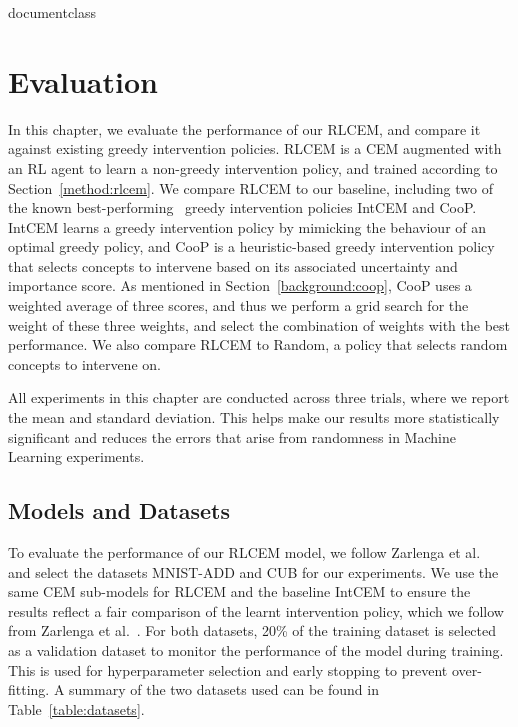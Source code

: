 \csname documentclass

\chapter{Evaluation}

In this chapter, we evaluate the performance of our RLCEM, and compare it 
against existing greedy intervention policies. RLCEM is a CEM augmented with an RL agent
to learn a non-greedy intervention policy, and trained according to Section~\ref{method:rlcem}.
We compare RLCEM to our baseline, 
including two of the known best-performing~\cite{intcem} 
greedy intervention policies
IntCEM and CooP. IntCEM learns a greedy intervention policy
by mimicking the behaviour of an optimal greedy policy,
and CooP is a heuristic-based greedy intervention policy
that selects concepts to intervene based on its associated uncertainty
and importance score. As mentioned in
Section~\ref{background:coop}, CooP uses a weighted average
of three scores, and thus we perform a grid search for the weight 
of these three weights, and select the combination of weights with the best performance.
We also compare RLCEM to Random, a policy that selects
random concepts to intervene on.


All experiments in this chapter
are conducted across three trials, where we report the mean
and standard deviation. This helps make our results more statistically significant and reduces the errors
that arise from randomness in Machine
Learning experiments.

\section{Models and Datasets}\label{method:datasets}
To evaluate the performance of our RLCEM model,
we follow Zarlenga et al.~\cite{intcem} and select the datasets MNIST-ADD and CUB for 
our experiments. 
We use the same CEM sub-models
for RLCEM and the baseline IntCEM to ensure the results reflect a fair comparison 
of the learnt intervention policy, which we follow from Zarlenga et al.~\cite{intcem}.
For both datasets, 20\% of the training dataset is selected
as a validation dataset to monitor
the performance of the model during training. This is used for hyperparameter
selection and early stopping to prevent over-fitting. A summary of the two
datasets used can be found in Table~\ref{table:datasets}.

